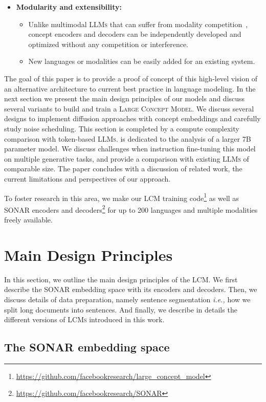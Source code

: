 \documentclass[twoside,11pt]{fairmeta}
\newcommand{\llms}{\textsc{LLMs}\xspace}
\newcommand{\sonar}{\textsc{SONAR}\xspace}
\newcommand{\lcm}{\textsc{LCM}\xspace}
\newcommand{\lcms}{\textsc{LCMs}\xspace}
\newcommand{\LCM}{\textsc{Large Concept Model}\xspace}
\newcommand{\sonargithub}{\url{https://github.com/facebookresearch/SONAR}}
\newcommand{\meresgithub}{\url{https://github.com/facebookresearch/large_concept_model}}
\newcommand{\ie}{\textit{i.e.,}\xspace}
\begin{document}
\begin{itemize}[style=unboxed,leftmargin=*]
    \item \textbf{Modularity and extensibility:}
        \begin{itemize}[style=unboxed,leftmargin=*]
            \item Unlike multimodal \llms that can suffer from modality competition~\citep{aghajanyan2023scaling,chameleon:2024:arxiv}, concept encoders and decoders can be independently developed and optimized without any competition or interference. 
            \item New languages or modalities can be easily added for an existing system.
        \end{itemize}
\end{itemize}


The goal of this paper is to provide a proof of concept of this high-level vision of an alternative architecture to current best practice in language modeling.
In the next section we present the main design principles of our models and discuss several variants to build and train a \LCM.
We discuss several designs to implement diffusion approaches with concept embeddings and carefully study noise scheduling. This section is completed by a compute complexity comparison with token-based \llms.
 is dedicated to the analysis of a larger 7B parameter model. We discuss challenges when instruction fine-tuning this model on multiple generative tasks, and provide a comparison with existing \llms of comparable size.
The paper concludes with a discussion of related work, the current limitations and perspectives of our approach.

To foster research in this area, we make our \lcm training code\footnote{\meresgithub} as well as SONAR encoders and decoders\footnote{\sonargithub} for up to 200 languages and multiple modalities freely available.

\newpage
\section{Main Design Principles}

In this section, we outline the main design principles of the \lcm. 
We first describe the \sonar embedding space with its encoders and decoders.
Then, we discuss details of data preparation, namely sentence segmentation \ie how we split long documents into sentences. 
And finally, we describe in details the different versions of \lcms introduced in this work.

\subsection{The \sonar embedding space}
\label{sec:archi:sonar}
\end{document}
